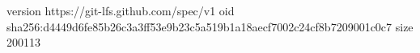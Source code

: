 version https://git-lfs.github.com/spec/v1
oid sha256:d4449d6fe85b26c3a3ff53e9b23c5a519b1a18aecf7002c24cf8b7209001c0c7
size 200113
